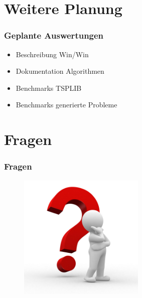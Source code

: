 \documentclass[12pt]{beamer}
\begin{document}
    \section{Weitere Planung}
    \begin{frame}
        \frametitle{Geplante Auswertungen}
	    \begin{itemize}
                \item Beschreibung Win/Win
                \item Dokumentation Algorithmen
                \item Benchmarks TSPLIB
                \item Benchmarks generierte Probleme
            \end{itemize}
    \end{frame}

    \section{Fragen}
    \begin{frame}
    \frametitle{Fragen}
        \begin{figure}[H]
	    \centering
	        \includegraphics[width=6cm]{gfx/questionmark}
        \end{figure}
    \end{frame}
\end{document}
